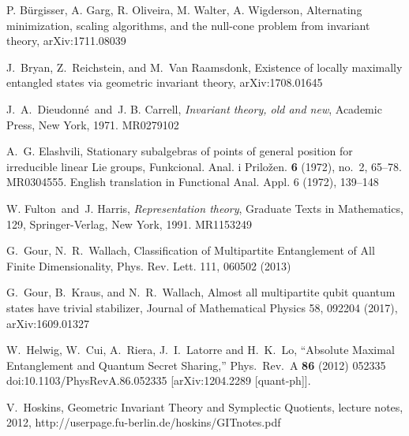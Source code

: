 \documentclass[12pt]{article}
\theoremstyle{definition}
\begin{document}

\begin{thebibliography}{BGOWW}
% 

P. B\"urgisser, A. Garg, R. Oliveira, M. Walter, A. Wigderson,
Alternating minimization, scaling algorithms, and the null-cone problem from invariant theory, arXiv:1711.08039

J.~Bryan,  Z.~Reichstein, and M.~Van Raamsdonk,
Existence of locally maximally entangled states via geometric invariant theory,
arXiv:1708.01645

J.~A.~Dieudonn\'e\ and\ J. B. Carrell, {\it Invariant theory, old and new}, Academic Press, New York, 1971. MR0279102

A.~G. %
Elashvili, Stationary subalgebras of points of general position
for irreducible linear Lie groups, Funkcional. Anal. i Prilo\v zen.
{\bf 6} (1972), no.~2, 65--78. MR0304555.
English translation in Functional Anal. Appl. 6 (1972), 139--148

W. Fulton\ and\ J. Harris, {\it Representation theory}, Graduate Texts in Mathematics, 129, Springer-Verlag, New York, 1991. MR1153249


 G.~Gour, N.~R.~Wallach,
Classification of Multipartite Entanglement of All Finite Dimensionality,
Phys. Rev. Lett. 111, 060502 (2013)

G.~Gour, B.~Kraus, and N.~R.~Wallach, Almost all multipartite qubit quantum states have trivial stabilizer, 
Journal of Mathematical Physics 58, 092204 (2017),  arXiv:1609.01327

  W.~Helwig, W.~Cui, A.~Riera, J.~I.~Latorre and H.~K.~Lo,
  ``Absolute Maximal Entanglement and Quantum Secret Sharing,''
  Phys.\ Rev.\ A {\bf 86} (2012) 052335
  doi:10.1103/PhysRevA.86.052335
  [arXiv:1204.2289 [quant-ph]].

V.~Hoskins, Geometric Invariant Theory and Symplectic Quotients,
lecture notes, 2012,
\noindent
http://userpage.fu-berlin.de/hoskins/GITnotes.pdf


\end{thebibliography}
\end{document}
